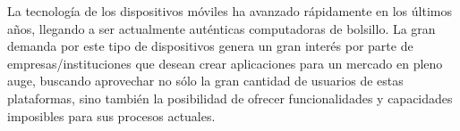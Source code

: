 \begin{comment}
Requisitos del proyecto y los problemas a encarar
Razón de ser del proyecto: aplicación, investigación, etc.
Especificaciones generales del proyecto.


introducción es una sección inicial que establece el propósito y los objetivos de todo el contenido posterior del escrito. En general va seguido del cuerpo o desarrollo del tema, y de las conclusiones.

En la introducción normalmente se describe el alcance del documento, y se da una breve explicación o resumen de éste. También puede explicar algunos antecedentes que son importantes para el posterior desarrollo del tema central. Un lector al leer una introducción debería poder hacerse una idea sobre el contenido del texto, antes de comenzar su lectura propiamente dicha.

En artículos técnicos, la introducción generalmente incluye una o más sub-secciones estándar, como lo son el resumen o síntesis, el prefacio y los agradecimientos. Alternativamente, la sección de introducción puede ser un capítulo más del trabajo en sí, dividido en las sub-secciones anteriormente mencionadas. Cuando el libro se divide en capítulos numerados, por convención la introducción y cualquier otro asunto delante de las secciones de cuerpo o desarrollo no se enumeran (o se enumeran de manera distinta) y preceden al capítulo 1.

El concepto de introducción es independiente del contenido del documento al cual introduce. Siempre debe presentar el objeto o problema a desarrollar, ya este se trate de una especificación formal, un producto, un personaje o un ente cualquiera.
\end{comment}

La tecnología de los dispositivos móviles ha avanzado rápidamente en los últimos años, llegando a ser actualmente auténticas computadoras de bolsillo. La gran demanda por este tipo de dispositivos genera un gran interés por parte de empresas/instituciones que desean crear aplicaciones para un mercado en pleno auge, buscando aprovechar no sólo la gran cantidad de usuarios de estas plataformas, sino también la posibilidad de ofrecer funcionalidades y capacidades imposibles para sus procesos actuales.


